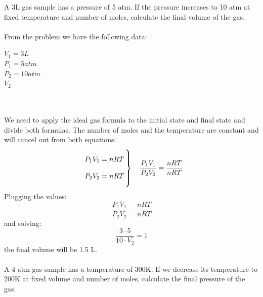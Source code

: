 \documentclass[main.tex]{subfiles}
\begin{document}
\begin{description}
\begin{example} %
A 3L gas sample has a pressure of 5 atm. If the pressure increases to 10 atm at fixed temperature and number of moles, calculate the final volume of the gas. 
\\
\\
From the problem we have the following data:
\begin{tcbitemize}[raster columns=3, raster rows=3, enhanced, sharp corners, raster equal height=rows, raster force size=false, raster column skip=0pt, raster row skip = 0pt]
\tcbitem[blankest, width=1cm]
\tcbitem[header = helpful]
\texta
\tcbitem[header = harmful]
\textb
\tcbitem[firstcol = internal]
\textcn
\tcbitem[swotbox = G]
$V_1=3L$\\
$P_1=5atm$\\
$P_2=10atm$\\
\tcbitem[swotbox = A]
$V_2$\\
\\
\\
\end{tcbitemize}%
We need to apply the ideal gas formula to the initial state and final state and divide both formulas. The number of moles and the temperature are constant and will cancel out from both equations:
\begin{equation}
  \left.
  \raisebox{0pt}[30pt]{\smash{$\begin{array}{r@{}l@{\,}l}
   &  P_1V_1=nRT \\
   \\ 
    & P_2V_2=nRT \\
  \end{array}$}}
  \right\} \quad \frac{P_1V_1}{P_2V_2}=\frac{nRT}{nRT} 
\end{equation}
Plugging the values:
\begin{equation}
\frac{P_1V_1}{P_2V_2}=\frac{nRT}{nRT} 
\end{equation}
and solving:
\begin{equation}
\frac{3\cdot 5}{10\cdot V_2}=1
\end{equation}
the final volume will be 1.5 L.
\\
\faDiamond\ \\
A 4 atm gas sample has a temperature of 300K. If we decrease its temperature to 200K at fixed volume and number of moles, calculate the final pressure of the gas.\\

\end{example}
\end{description}
\end{document}
